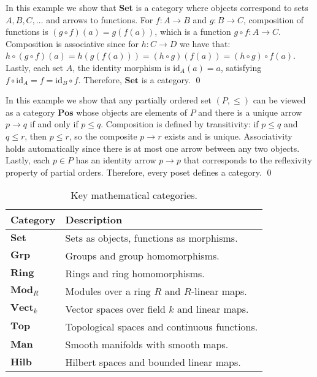 \begin{example} In this example we show that \textbf{Set} is a category where objects correspond to sets $A,B,C,\dots$ and arrows to functions.
  For $f: A \to B$ and $g: B \to C$, composition of functions is $(g \circ f)(a) = g(f(a))$, which is a function $ g \circ f : A \to C$.
  Composition is associative since for $h: C \to D$ we have that: \( h \circ (g \circ f)(a) = h(g(f(a))) = (h \circ g)(f(a)) = (h \circ g) \circ f(a) \).
  Lastly, each set $A$, the identity morphism is $\mathrm{id}_A(a) = a$, satisfying $f \circ \mathrm{id}_A = f = \mathrm{id}_B \circ f$.
  Therefore, $\mathbf{Set}$ is a category. \qed
\end{example}
\begin{example}
In this example we show that any partially ordered set $(P, \leq)$ can be viewed as a category $\mathbf{Pos}$ whose objects are elements of $P$ and there is a unique arrow $p \to q$ 
if and only if $p \leq q$.  
Composition is defined by transitivity: if $p \leq q$ and $q \leq r$, then $p \leq r$, 
so the composite $p \to r$ exists and is unique.  
Associativity holds automatically since there is at most one arrow between any two objects.  
Lastly, each $p \in P$ has an identity arrow $p \to p$ that corresponds to the reflexivity property of partial orders.
Therefore, every poset defines a category. \qed
\end{example}

\begin{table*}[h!]
\centering
\begin{tabular}{ll}
\hline
\textbf{Category} & \textbf{Description} \\
\hline
$\mathbf{Set}$      & Sets as objects, functions as morphisms. \\
$\mathbf{Grp}$      & Groups and group homomorphisms. \\
$\mathbf{Ring}$     & Rings and ring homomorphisms. \\
$\mathbf{Mod}_R$    & Modules over a ring $R$ and $R$-linear maps. \\
$\mathbf{Vect}_k$   & Vector spaces over field $k$ and linear maps. \\
$\mathbf{Top}$      & Topological spaces and continuous functions. \\
$\mathbf{Man}$      & Smooth manifolds with smooth maps. \\
$\mathbf{Hilb}$     & Hilbert spaces and bounded linear maps. \\
\hline
\end{tabular}
\caption{Key mathematical categories.}
\label{tab:math-categories}
\end{table*}

